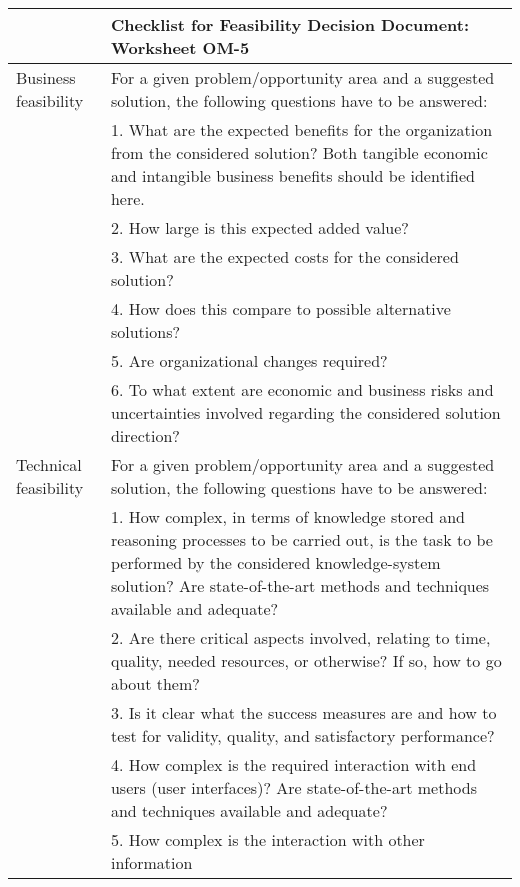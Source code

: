 \begin{tabular}%
       {|>{\colleft}p{3cm}%
        |>{\colleft}p{10cm}|}
\hline
{\bf Organization Model} &
  {\bf Checklist for Feasibility Decision Document: Worksheet OM-5} \\
\hline
\hline
\sc Business feasibility &
   {\rm
   For a given problem/opportunity area and a suggested solution, the
   following questions have to be answered:
   } \\
 & {\rm 1. What are the expected benefits for the organization
           from the considered solution? Both tangible economic and
           intangible business benefits should be identified here.
           } \\
 & {\rm 2. How large is this expected added value?
           } \\
 & {\rm 3. What are the expected costs for the considered solution?
           } \\
 & {\rm 4. How does this compare to possible alternative solutions?
           } \\
 & {\rm 5. Are organizational changes required?
           } \\
 & {\rm 6. To what extent are economic and business risks and
           uncertainties involved regarding the considered solution
           direction?
           } \\
\hline
\sc Technical feasibility &
   {\rm
   For a given problem/opportunity area and a suggested solution, the
   following questions have to be answered:
   } \\
 & {\rm 1. How complex, in terms of knowledge stored and
           reasoning processes to be carried out, is the task to be
           performed by the considered knowledge-system solution?
           Are state-of-the-art methods and techniques available and
           adequate?
           } \\
 & {\rm 2. Are there critical aspects involved, relating to time,
           quality, needed resources, or otherwise? If so, how to
           go about them?
           } \\
 & {\rm 3. Is it clear what the success measures are and how to test
           for validity, quality, and satisfactory performance?
           } \\
 & {\rm 4. How complex is the required interaction with end users
           (user interfaces)? Are state-of-the-art methods and
           techniques available and adequate?
           } \\
 & {\rm 5. How complex is the interaction with other information
}
\end{tabular}
